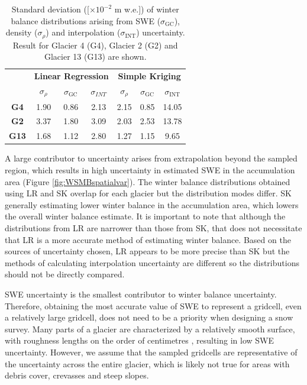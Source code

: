 \documentclass[twocolumn, letterpaper]{igs}
\begin{document}
 \begin{table}[]
\centering
\caption{Standard deviation ([$\times10^{-2}$ m w.e.]) of winter balance distributions arising from SWE ($\sigma_{\mathrm{GC}}$), density ($\sigma_{\rho}$) and interpolation ($\sigma_{\mathrm{INT}}$) uncertainty. Result for Glacier 4 (G4), Glacier 2 (G2) and Glacier 13 (G13) are shown.}
\label{tab:WSMBdistribution_sigma}
\begin{tabular}{ccccccc}
\textbf{} & \multicolumn{3}{c}{\textbf{Linear Regression}} & \multicolumn{3}{c}{\textbf{Simple Kriging}} \\
 & $\sigma_{\rho}$ & $\sigma_{\mathrm{GC}}$ & $\sigma_{INT}$ & $\sigma_{\rho}$ & $\sigma_{\mathrm{GC}}$ & $\sigma_{\mathrm{INT}}$ \\
\midrule
\textbf{G4} & 1.90 & 0.86 & 2.13 & 2.15 & 0.85 & 14.05 \\
\textbf{G2} &3.37 & 1.80 & 3.09 & 2.03 & 2.53 & 13.78 \\
\textbf{G13} & 1.68 & 1.12 & 2.80 & 1.27 & 1.15 & 9.65
\end{tabular}
\end{table}



A large contributor to uncertainty arises from extrapolation beyond the sampled region, which results in high uncertainty in estimated SWE in the accumulation area (Figure \ref{fig:WSMBspatialvar}). The winter balance distributions obtained using LR and SK overlap for each glacier but the distribution modes differ. SK generally estimating lower winter balance in the accumulation area, which lowers the overall winter balance estimate. It is important to note that although the distributions from LR are narrower than those from SK, that does not necessitate that LR is a more accurate method of estimating winter balance. Based on the sources of uncertainty chosen, LR appears to be more precise than SK but the methods of calculating interpolation uncertainty are different so the distributions should not be directly compared.

SWE uncertainty is the smallest contributor to winter balance uncertainty. Therefore, obtaining the most accurate value of SWE to represent a gridcell, even a relatively large gridcell, does not need to be a priority when designing a snow survey. Many parts of a glacier are characterized by a relatively smooth surface, with roughness lengths on the order of centimetres \citep[e.g.][]{Hock2005}, resulting in low SWE uncertainty. However, we assume that the sampled gridcells are representative of the uncertainty across the entire glacier, which is likely not true for areas with debris cover, crevasses and steep slopes.
\end{document}
